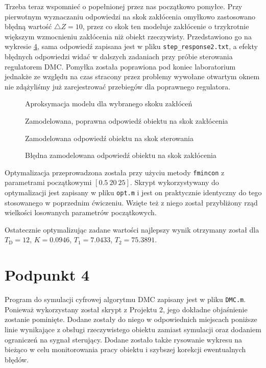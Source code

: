 Trzeba teraz wspomnieć o popełnionej przez nas początkowo pomyłce. Przy pierwotnym wyznaczaniu odpowiedzi na skok zakłócenia omyłkowo zastosowano błędną wartość $ \triangle Z = 10 $, przez co skok ten modeluje zakłócenie o trzykrotnie większym wzmocnieniu zakłócenia niż obiekt rzeczywisty. Przedstawiono go na wykresie \ref{R6}, sama odpowiedź zapisana jest w pliku \verb|step_response2.txt|, a efekty błędnych odpowiedzi widać w dalszych zadaniach przy próbie sterowania regulatorem DMC. Pomyłka została poprawiona pod koniec laboratorium jednakże ze względu na czas stracony przez problemy wywołane otwartym oknem nie zdążyliśmy już zarejestrować przebiegów dla poprawnego regulatora.

\begin{figure}[ht]
\centering

\caption{Aproksymacja modelu dla wybranego skoku zakłóceń}
\label{R3}
\end{figure}

\begin{figure}[ht]
\centering

\caption{Zamodelowana, poprawna odpowiedź obiektu na skok zakłócenia}
\label{R4}
\end{figure}

\begin{figure}[ht]
\centering

\caption{Zamodelowana odpowiedź obiektu na skok sterowania}
\label{R5}
\end{figure}

\begin{figure}[ht]
\centering

\caption{Błędna zamodelowana odpowiedź obiektu na skok zakłócenia}
\label{R6}
\end{figure}

Optymalizacja przeprowadzona została przy użyciu metody \verb+fmincon+ z parametrami początkowymi $[\num{0,5} ~ 20 ~ 25]$. Skrypt wykorzystywany do optymalizacji jest zapisany w pliku \verb|opt.m| i jest on praktycznie identyczny do tego stosowanego w poprzednim ćwiczeniu. Wzięte też z niego został przybliżony rząd wielkości losowanych parametrów początkowych.

Ostatecznie optymalizując zadane wartości najlepszy wynik otrzymany został dla $T_{\mathrm{D}}=12$, $K=\num{0.0946}$, $T_1=\num{7.0433}$, $T_2=\num{75.3891}$.

\chapter{Podpunkt 4}
Program do symulacji cyfrowej algorytmu DMC zapisany jest w pliku \verb+DMC.m+. Ponieważ wykorzystany został skrypt z Projektu 2, jego dokładne objaśnienie zostanie pominięte. Dodane zostały do niego w odpowiednich miejscach poniższe linie wynikające z obsługi rzeczywistego obiektu zamiast symulacji oraz dodaniem ograniczeń na sygnał sterujący. Dodane zostało także rysowanie wykresu na bieżąco w celu monitorowania pracy obiektu i szybszej korekcji ewentualnych błędów.

